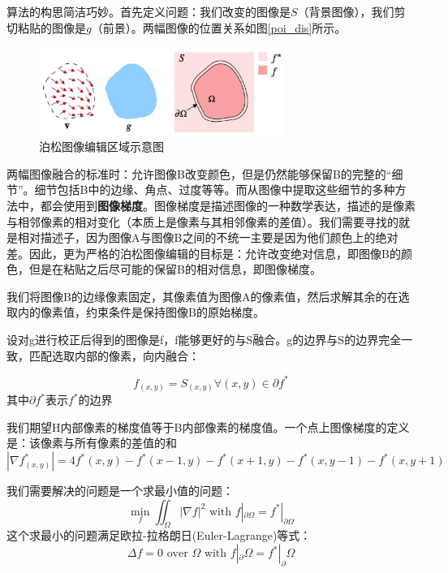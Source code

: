 算法的构思简洁巧妙。首先定义问题：我们改变的图像是\(S\)（背景图像），我们剪切粘贴的图像是\(g\)（前景）。两幅图像的位置关系如图\ref{poi_dis}所示。

\begin{figure}
\centering\includegraphics[width=8.00cm]{imgs/ch2/poi_dis}
\caption{泊松图像编辑区域示意图}
\label{fig:poi_dis}
\end{figure}

两幅图像融合的标准时：允许图像B改变颜色，但是仍然能够保留B的完整的“细节”。细节包括B中的边缘、角点、过度等等。而从图像中提取这些细节的多种方法中，都会使用到\textbf{图像梯度}。图像梯度是描述图像的一种数学表达，描述的是像素与相邻像素的相对变化（本质上是像素与其相邻像素的差值）。我们需要寻找的就是相对描述子，因为图像A与图像B之间的不统一主要是因为他们颜色上的绝对差。因此，更为严格的泊松图像编辑的目标是：允许改变绝对信息，即图像B的颜色，但是在粘贴之后尽可能的保留B的相对信息，即图像梯度。

我们将图像B的边缘像素固定，其像素值为图像A的像素值，然后求解其余的在选取内的像素值，约束条件是保持图像B的原始梯度。

设对g进行校正后得到的图像是f，f能够更好的与S融合。g的边界与S的边界完全一致，匹配选取内部的像素，向内融合：

\begin{equation}
f_{(x,y)} = S_{(x,y)}\forall{(x,y)}\in{\partial{f^*}}
\end{equation}
其中\(\partial{f^*}\)表示\(f^*\)的边界

我们期望H内部像素的梯度值等于B内部像素的梯度值。一个点上图像梯度的定义是：该像素与所有像素的差值的和
\begin{equation}
|\nabla{f^*_{(x,y)}}| = 4f^*(x,y) - f^*(x-1,y) - f^*(x+1,y) - f^*(x,y-1) - f^*(x,y+1)
\end{equation}

我们需要解决的问题是一个求最小值的问题：
\begin{equation}
\mathop {min}\limits_{f}\iint_{\Omega}^{} |\nabla{f}|^2\text{ with }f|_{\partial\Omega} = f^*|_{\partial\Omega}
\label{fusion_problem}
\end{equation}
这个求最小的问题满足欧拉-拉格朗日(Euler-Lagrange)等式：
\begin{equation}
\Delta f = 0\text{ over }\Omega\text{ with }f|_\partial{\Omega} = f^*|_\partial{\Omega}
\label{eul-lag}
\end{equation}

